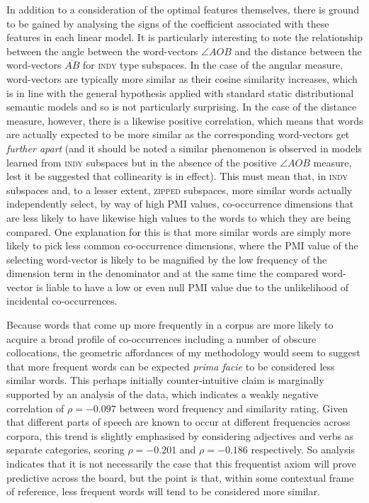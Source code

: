 In addition to a consideration of the optimal features themselves, there is ground to be gained by analysing the signs of the coefficient associated with these features in each linear model.  It is particularly interesting to note the relationship between the angle between the word-vectors $\angle AOB$ and the distance between the word-vectors $\overline{AB}$ for \textsc{indy} type subspaces.  In the case of the angular measure, word-vectors are typically more similar as their cosine similarity increases, which is in line with the general hypothesis applied with standard static distributional semantic models and so is not particularly surprising.  In the case of the distance measure, however, there is a likewise positive correlation, which means that words are actually expected to be more similar as the corresponding word-vectors get \emph{further apart} (and it should be noted a similar phenomenon is observed in models learned from \textsc{indy} subspaces but in the absence of the positive $\angle AOB$ measure, lest it be suggested that collinearity is in effect).  This must mean that, in \textsc{indy} subspaces and, to a lesser extent, \textsc{zipped} subspaces, more similar words actually independently select, by way of high PMI values, co-occurrence dimensions that are less likely to have likewise high values to the words to which they are being compared.  One explanation for this is that more similar words are simply more likely to pick less common co-occurrence dimensions, where the PMI value of the selecting word-vector is likely to be magnified by the low frequency of the dimension term in the denominator and at the same time the compared word-vector is liable to have a low or even null PMI value due to the unlikelihood of incidental co-occurrences.

Because words that come up more frequently in a corpus are more likely to acquire a broad profile of co-occurrences including a number of obscure collocations, the geometric affordances of my methodology would seem to suggest that more frequent words can be expected \emph{prima facie} to be considered less similar words.  This perhaps initially counter-intuitive claim is marginally supported by an analysis of the data, which indicates a weakly negative correlation of $\rho = -0.097$ between word frequency and similarity rating.  Given that different parts of speech are known to occur at different frequencies across corpora, this trend is slightly emphasised by considering adjectives and verbs as separate categories, scoring $\rho = -0.201$ and $\rho = -0.186$ respectively.  So analysis indicates that it is not necessarily the case that this frequentist axiom will prove predictive across the board, but the point is that, within some contextual frame of reference, less frequent words will tend to be considered more similar.

